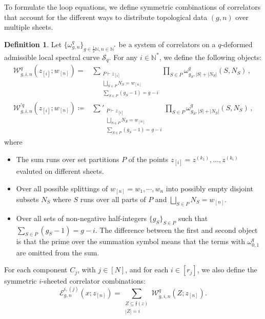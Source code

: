 \documentclass[reqno,11pt]{amsart}
\theoremstyle{plain}
\theoremstyle{definition}
\newtheorem{definition}[theorem]{Definition}
\theoremstyle{remark}
\numberwithin{equation}{section}
\newcommand{\mb}[1]{\mathbb{#1}}
\newcommand{\mf}[1]{\mathfrak{#1}}
\newcommand{\mc}[1]{\mathcal{#1}}
\newcommand{\1}{\mathds{1}}
\newcommand{\N}{\mb{N}}
\newcommand{\2}{\frac{1}{2}}
\begin{document}
{				To formulate the loop equations, we define symmetric combinations of correlators that account for the different ways to distribute topological data $(g,n)$ over multiple sheets.
				\begin{definition}\label{d:EW}
					Let $ \{ \omega^{q}_{g,n} \}_{g \in \frac{1}{2} \N, n\in \N^*}$ be a system of correlators on a $q$-deformed admissible local  spectral curve $\mathcal{S}_q$.  For any $i \in \mathbb{N}^*$, we define the following objects:
					\begin{align}\label{partiallydisconnected}
						\mc{W}^{q}_{g,i,n} (z_{[i]} ; w_{[n]}) =& \sum_{\substack{P \vdash z_{[i]} \\ \bigsqcup_{S \in P} N_S = w_{[n]}\\ \sum_{S \in P} (g_S -1) = g-i}}\prod_{S \in P} \omega^{q}_{g_S, |S| + |N_S|}(S, N_S) \,, \\
						\mc{W}^{'q}_{g,i,n} (z_{[i]} ; w_{[n]}) \coloneqq& \sum'_{\substack{P \vdash z_{[i]} \\ \bigsqcup_{S \in P} N_S = w_{[n]}\\ \sum_{S \in P} (g_S -1) = g-i}}\prod_{S \in P} \omega^{q}_{g_S, |S| + |N_S|}(S, N_S) \,,
					\end{align}
					where 
					\begin{itemize}
						\item[(a)] The sum runs over set partitions $P$ of the points $z_{[i]} = {z^{(k_1)}, \dots, z^{(k_i)}}$ evaluted on different sheets.
						\item[(b)] Over all possible splittings of $w_{[n]}=w_1,\cdots,w_n$ into possibly empty disjoint subsets $N_S$ where $S$ runs over all parts of $P$ and $\bigsqcup_{S \in P} N_S = w_{[n]}$.
						\item[(c)] Over all sets of non-negative half-integers $\{ g_S \}_{S \in P}$ such that $\sum_{S \in P} (g_S - 1) = g-i$. The difference between the first and second object is that the prime over the summation symbol means that the terms with $\omega^{q}_{0,1}$ are omitted from the sum.
					\end{itemize}
				\end{definition}
				For each component $C_j$, with $j \in [N]$, and for each $i \in [ r_j]$, we also define the symmetric $i$-sheeted correlator combinations:
				\begin{equation}
					{\mathcal{E}^{i, (j)}_{g,n}(x; z_{[n]}) = \sum_{\substack{Z \subseteq \mf{f}(z) \\ |Z| = i}} \mc{W}^{q}_{g,i,n}(Z; z_{[n]}).}
				\end{equation}
}
\end{document}
